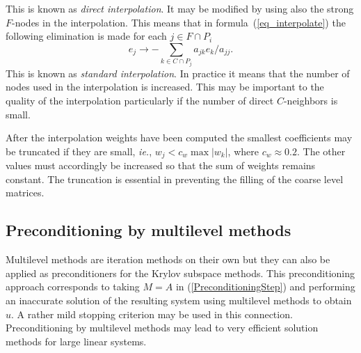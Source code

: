 This is known as {\em direct interpolation}. It may be modified by using also 
the strong $F$-nodes in the interpolation. This means that 
in formula~(\ref{eq_interpolate}) the following 
elimination is made for each $j \in F \cap P_i$
\begin{equation}
  e_j \rightarrow - \sum_{k \in C \cap P_j} a_{jk}e_k/a_{jj} .
\end{equation}
This is known as {\em standard interpolation}.
In practice it means that the number of nodes used in the interpolation
is increased. This may be important to the quality of the interpolation 
particularly if the number of direct $C$-neighbors is small.

After the interpolation weights have been computed the smallest 
coefficients may be truncated if they are small, {\em ie.},
$w_j < c_w \max | w_k | $, where $c_w \approx 0.2$.
The other values must accordingly be increased so that the sum of weights
remains constant.
The truncation is essential in preventing the 
filling of the coarse level matrices.


\subsection{Preconditioning by multilevel methods}\label{MultilevelPreconditioning}

Multilevel methods are iteration methods on their own but they can also be
applied as preconditioners for the Krylov subspace methods. 
This preconditioning approach corresponds to taking $M=A$ in (\ref{PreconditioningStep}) 
and performing an inaccurate solution of the resulting system using multilevel methods
to obtain $u$. A rather mild stopping criterion may be used in this connection. 
Preconditioning by multilevel methods may lead to very efficient solution methods for
large linear systems. 

